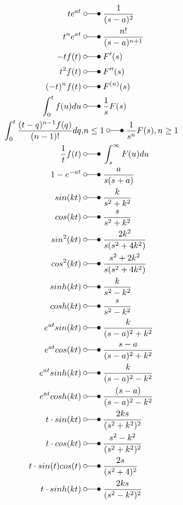 \begin{align*}
    te^{at}                         \;&\laplace\; \frac{1}{(s-a)^2}  \\
    t^{n}e^{at}                     \;&\laplace\; \frac{n!}{(s-a)^{n+1}}  \\
    -tf(t)                          \;&\laplace\; F^{\prime}(s)  \\
    t^{2}f(t)                       \;&\laplace\; F^{\prime\prime}(s)  \\
    (-t)^n f(t)                     \;&\laplace\; F^{(n)}(s)  \\
    \int_{0}^{t}f(u)du              \;&\laplace\; \frac{1}{s}F(s)  \\
    \int_{0}^{t}\frac{(t-q)^{n-1}f(q)}{(n-1)!}dq,&n \leq 1 \;\laplace\; \frac{1}{s^n}F(s),n \geq 1  \\
    \frac{1}{t}f(t)                 \;&\laplace\; \int_{s}^{\infty}F(u)du  \\
    1-e^{-at}                       \;&\laplace\; \frac{a}{s(s+a)}  \\
    sin(kt)                         \;&\laplace\; \frac{k}{s^2+k^2}  \\
    cos(kt)                         \;&\laplace\; \frac{s}{s^2+k^2}  \\
    sin^{2}(kt)                     \;&\laplace\; \frac{2k^2}{s(s^2+4k^2)}  \\
    cos^{2}(kt)                     \;&\laplace\; \frac{s^2+2k^2}{s(s^2+4k^2)}  \\
    sinh(kt)                        \;&\laplace\; \frac{k}{s^2-k^2} \\
    cosh(kt)                        \;&\laplace\; \frac{s}{s^2-k^2} \\
    e^{at}sin(kt)                   \;&\laplace\; \frac{k}{(s-a)^2+k^2}  \\
    e^{at}cos(kt)                   \;&\laplace\; \frac{s-a}{(s-a)^2+k^2}  \\
    e^{at}sinh(kt)                  \;&\laplace\; \frac{k}{(s-a)^2-k^2}  \\
    e^{at}cosh(kt)                  \;&\laplace\; \frac{(s-a)}{(s-a)^2-k^2}  \\
    t\cdot sin(kt)                        \;&\laplace\; \frac{2ks}{(s^2+k^2)^2}  \\
    t\cdot cos(kt)                        \;&\laplace\; \frac{s^2-k^2}{(s^2+k^2)^2}  \\
    t\cdot sin(t)cos(t)                   \;&\laplace\; \frac{2s}{(s^2+4)^2}  \\
    t\cdot sinh(kt)                       \;&\laplace\; \frac{2ks}{(s^2-k^2)^2}  \\

\end{align*}
